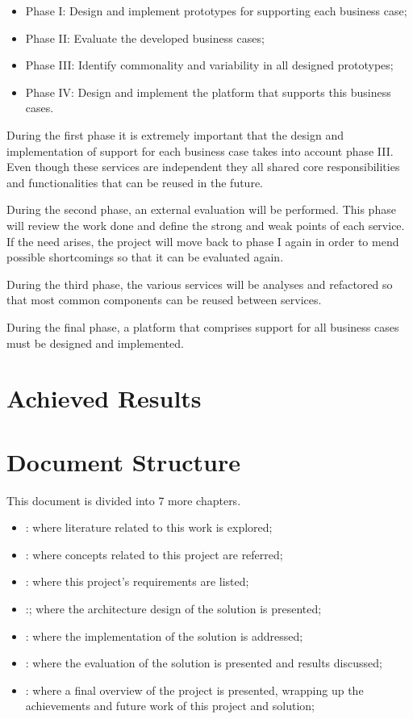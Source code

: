 \begin{itemize}
    \item Phase I: Design and implement prototypes for supporting each business case;
    \item Phase II: Evaluate the developed business cases;
    \item Phase III: Identify commonality and variability in all designed prototypes;
    \item Phase IV: Design and implement the platform that supports this business cases.
\end{itemize}

During the first phase it is extremely important that the design and implementation of support for each business case takes into account phase III. Even though these services are independent they all shared core responsibilities and functionalities that can be reused in the future.

During the second phase, an external evaluation will be performed. This phase will review the work done and define the strong and weak points of each service. If the need arises, the project will move back to phase I again in order to mend possible shortcomings so that it can be evaluated again.

During the third phase, the various services will be analyses and refactored so that most common components can be reused between services.

During the final phase, a platform that comprises support for all business cases must be designed and implemented.

\section{Achieved Results}
\label{sec:introduction:achieved_results}

\section{Document Structure}
\label{sec:introduction:document_structure}

This document is divided into 7 more chapters.

\begin{itemize}
    \item {}: where literature related to this work is explored;
    \item {}: where concepts related to this project are referred;
    \item {}: where this project's requirements are listed;
    \item {}:; where the architecture design of the solution is presented;
    \item {}: where the implementation of the solution is addressed;
    \item {}: where the evaluation of the solution is presented and results discussed;
    \item {}: where a final overview of the project is presented, wrapping up the achievements and future work of this project and solution;
\end{itemize}
